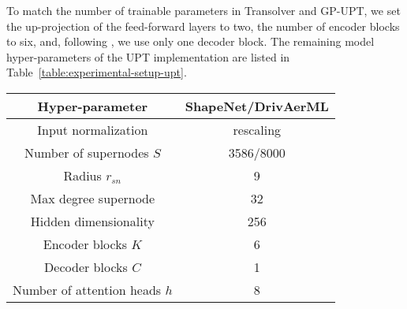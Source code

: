 To match the number of trainable parameters in Transolver and \ac{GP-UPT}, we set the up-projection of the feed-forward layers to two, the number of encoder blocks to six, and, following \citet{alkin2024universal}, we use only one decoder block. 
The remaining model hyper-parameters of the \ac{UPT} implementation are listed in Table~\ref{table:experimental-setup-upt}.
\begin{table*}[]
\centering
\caption{Hyper-parameter configuration for \ac{UPT}.}
\begin{tabular}{cc}
\hline
Hyper-parameter           & ShapeNet/DrivAerML                    \\ \hline
Input normalization       & rescaling \\
Number of supernodes $S$     & 3586/8000                             \\
Radius $r_{sn}$                        & 9                                     \\
Max degree supernode & 32                                    \\
Hidden dimensionality     & 256                               \\
Encoder blocks $K$          & 6                                   \\
Decoder blocks $C$           & 1                                   \\
Number of attention heads $h$ & 8                                   \\ \hline
\end{tabular}
\label{table:experimental-setup-upt}
\end{table*}
